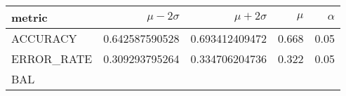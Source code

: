 \documentclass[11pt]{report}
\begin{document}
\begin{table}
    \centering
    \begin{tabular}{lrrrr}
    \hline
    
        \textbf{ metric }
        
           &
        
    
        \textbf{ $\mu - 2\sigma$ }
        
           &
        
    
        \textbf{ $\mu + 2\sigma$ }
        
           &
        
    
        \textbf{ $\mu$ }
        
           &
        
    
        \textbf{ $\alpha$ }
        
     
    \\
    \hline
    
        
            ACCURACY
             
               &
            
        
            0.642587590528
             
               &
            
        
            0.693412409472
             
               &
            
        
            0.668
             
               &
            
        
            0.05
            
        
        \\
    
        
            ERROR\_RATE
             
               &
            
        
            0.309293795264
             
               &
            
        
            0.334706204736
             
               &
            
        
            0.322
             
               &
            
        
            0.05
            
        
        \\
    
        
            BAL
             

\end{tabular}
\end{table}
\end{document}
